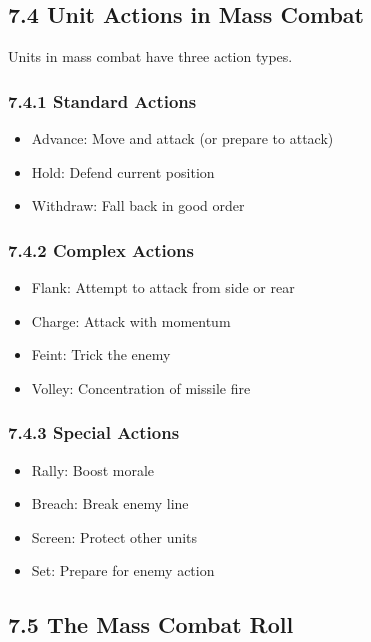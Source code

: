 \documentclass[11pt]{article}
\begin{document}
\subsection{7.4 Unit Actions in Mass Combat}

Units in mass combat have three action types.

\subsubsection{7.4.1 Standard Actions}

\begin{itemize}
  \item Advance: Move and attack (or prepare to attack)
  \item Hold: Defend current position
  \item Withdraw: Fall back in good order
\end{itemize}

\subsubsection{7.4.2 Complex Actions}

\begin{itemize}
  \item Flank: Attempt to attack from side or rear
  \item Charge: Attack with momentum
  \item Feint: Trick the enemy
  \item Volley: Concentration of missile fire
\end{itemize}

\subsubsection{7.4.3 Special Actions}

\begin{itemize}
  \item Rally: Boost morale
  \item Breach: Break enemy line
  \item Screen: Protect other units
  \item Set: Prepare for enemy action
\end{itemize}

\subsection{7.5 The Mass Combat Roll}
\end{document}
